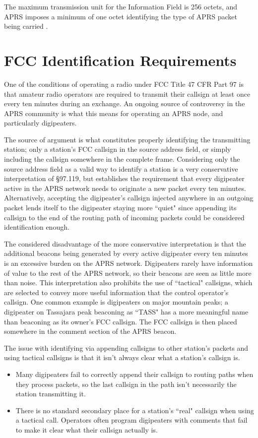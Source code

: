 The maximum transmission unit for the Information Field is 256 octets, and APRS imposes
a minimum of one octet identifying the type of APRS packet being carried \cite{aprsspec}.

\section{FCC Identification Requirements}

One of the conditions of operating a radio under FCC Title 47 CFR Part 97 is that amateur radio 
operators are required to transmit their callsign at least once every ten minutes during an exchange.
An ongoing source of controversy in the APRS community is what this means for operating
an APRS node, and particularly digipeaters.

The source of argument is what constitutes properly identifying the
transmitting station; only a station's FCC callsign in the source address field,
or simply including the callsign somewhere in the complete frame.
Considering only the source address field as a valid way to identify a station is
a very conservative interpretation of \S97.119, but establishes the requirement that every 
digipeater active in the APRS network needs to originate a new packet every ten minutes.
Alternatively, accepting the digipeater's callsign injected anywhere in an outgoing 
packet lends itself to the digipeater staying more ``quiet" since appending its callsign
to the end of the routing path of incoming packets could be considered identification enough.

The considered disadvantage of the more conservative interpretation is that the additional
beacons being generated by every active digipeater every ten minutes is an
excessive burden on the APRS network. Digipeaters rarely have information of value
to the rest of the APRS network, so their beacons are seen as little more than noise.
This interpretation also prohibits the use of ``tactical" callsigns, which are selected
to convey more useful information that the control operator's callsign.
One common example is digipeaters on major mountain peaks; a digipeater 
on Tassajara peak beaconing as ``TASS" has a more meaningful name than beaconing as
its owner's FCC callsign. The FCC callsign is then placed somewhere in the comment section
of the APRS beacon.

The issue with identifying via appending callsigns to other station's packets and
using tactical callsigns is that it isn't always clear what a station's callsign is.
\begin{itemize}
	\item Many digipeaters fail to correctly append their callsign to routing paths when
		they process packets, so the last callsign in the path isn't necessarily the 
		station transmitting it.
	\item There is no standard secondary place for a station's ``real" callsign 
		when using a tactical call.
		Operators often program digipeaters with comments that fail to make it clear
		what their callsign actually is.
\end{itemize}

